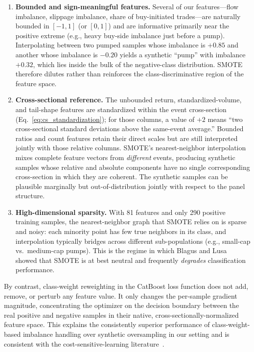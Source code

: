 \documentclass{ieeeaccess}
\begin{document}
\begin{enumerate}
    \item \textbf{Bounded and sign-meaningful features.} Several of our features---flow imbalance, slippage imbalance, share of buy-initiated trades---are naturally bounded in $[-1,1]$ (or $[0,1]$) and are informative primarily near the positive extreme (e.g., heavy buy-side imbalance just before a pump). Interpolating between two pumped samples whose imbalance is $+0.85$ and another whose imbalance is $-0.20$ yields a synthetic ``pump'' with imbalance $+0.32$, which lies inside the bulk of the negative-class distribution. SMOTE therefore dilutes rather than reinforces the class-discriminative region of the feature space.
    \item \textbf{Cross-sectional reference.} The unbounded return, standardized-volume, and tail-shape features are standardized within the event cross-section (Eq.~\ref{eq:cs_standardization}); for those columns, a value of $+2$ means ``two cross-sectional standard deviations above the same-event average.'' Bounded ratios and count features retain their direct scales but are still interpreted jointly with those relative columns. SMOTE's nearest-neighbor interpolation mixes complete feature vectors from \emph{different} events, producing synthetic samples whose relative and absolute components have no single corresponding cross-section in which they are coherent. The synthetic samples can be plausible marginally but out-of-distribution jointly with respect to the panel structure.
    \item \textbf{High-dimensional sparsity.} With 81 features and only 290 positive training samples, the nearest-neighbor graph that SMOTE relies on is sparse and noisy: each minority point has few true neighbors in its class, and interpolation typically bridges across different sub-populations (e.g., small-cap vs.\ medium-cap pumps). This is the regime in which Blagus and Lusa~\cite{blagus2013smote} showed that SMOTE is at best neutral and frequently \emph{degrades} classification performance.
\end{enumerate}

By contrast, class-weight reweighting in the CatBoost loss function does not add, remove, or perturb any feature value. It only changes the per-sample gradient magnitude, concentrating the optimizer on the decision boundary between the real positive and negative samples in their native, cross-sectionally-normalized feature space. This explains the consistently superior performance of class-weight-based imbalance handling over synthetic oversampling in our setting and is consistent with the cost-sensitive-learning literature~\cite{elkan2001cost}.
\end{document}
